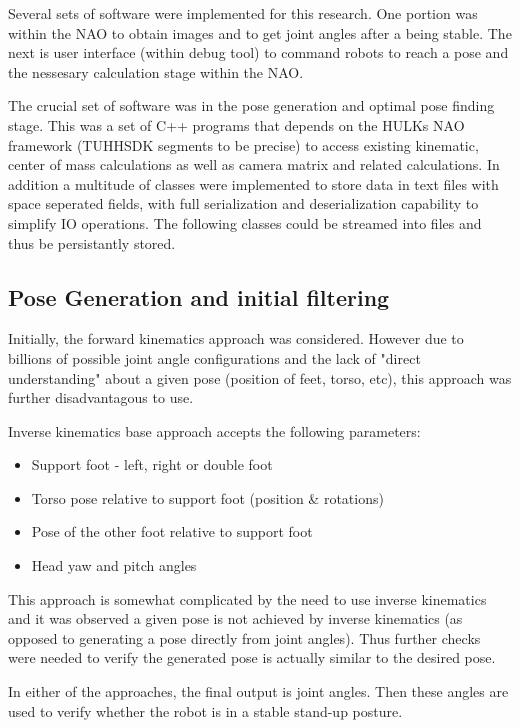 \documentclass[english, printversion, nomenclature, notitle]{tuvisionthesis} %
\begin{document}
Several sets of software were implemented for this research. One portion was within the NAO to obtain images and to get joint angles after a being stable. The next is user interface (within debug tool) to command robots to reach a pose and the nessesary calculation stage within the NAO.

The crucial set of software was in the pose generation and optimal pose finding stage. This was a set of C++ programs that depends on the HULKs NAO framework (TUHHSDK segments to be precise) to access existing kinematic, center of mass calculations as well as camera matrix and related calculations. In addition a multitude of classes were implemented to store data in text files with space seperated fields, with full serialization and deserialization capability to simplify IO operations. The following classes could be streamed into files and thus be persistantly stored.
\subsection{Pose Generation and initial filtering}

Initially, the forward kinematics approach was considered. However due to billions of possible joint angle configurations and the lack of "direct understanding" about a given pose (position of feet, torso, etc), this approach was further disadvantagous to use.

Inverse kinematics base approach accepts the following parameters:
\begin{itemize}
	\item Support foot - left, right or double foot
	\item Torso pose relative to support foot (position \& rotations)
	\item Pose of the other foot relative to support foot
	\item Head yaw and pitch angles
\end{itemize}
This approach is somewhat complicated by the need to use inverse kinematics and it was observed a given pose is not achieved by inverse kinematics (as opposed to generating a pose directly from joint angles). Thus further checks were needed to verify the generated pose is actually similar to the desired pose.

In either of the approaches, the final output is joint angles. Then these angles are used to verify whether the robot is in a stable stand-up posture.
\end{document}
